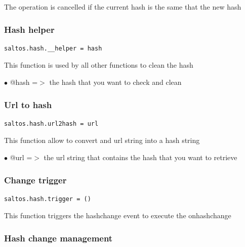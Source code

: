 \documentclass[a4paper]{article}
\begin{document}
The operation is cancelled if the current hash is the same that the new hash

\hypertarget{toc254}{}
\subsubsection{Hash helper}

\begin{lstlisting}
saltos.hash.__helper = hash
\end{lstlisting}

This function is used by all other functions to clean the hash

\begin{compactitem}
\item[\color{myblue}$\bullet$] @hash =$>$ the hash that you want to check and clean
\end{compactitem}

\hypertarget{toc255}{}
\subsubsection{Url to hash}

\begin{lstlisting}
saltos.hash.url2hash = url
\end{lstlisting}

This function allow to convert and url string into a hash string

\begin{compactitem}
\item[\color{myblue}$\bullet$] @url =$>$ the url string that contains the hash that you want to retrieve
\end{compactitem}

\hypertarget{toc256}{}
\subsubsection{Change trigger}

\begin{lstlisting}
saltos.hash.trigger = ()
\end{lstlisting}

This function triggers the hashchange event to execute the onhashchange

\hypertarget{toc257}{}
\subsubsection{Hash change management}
\end{document}
